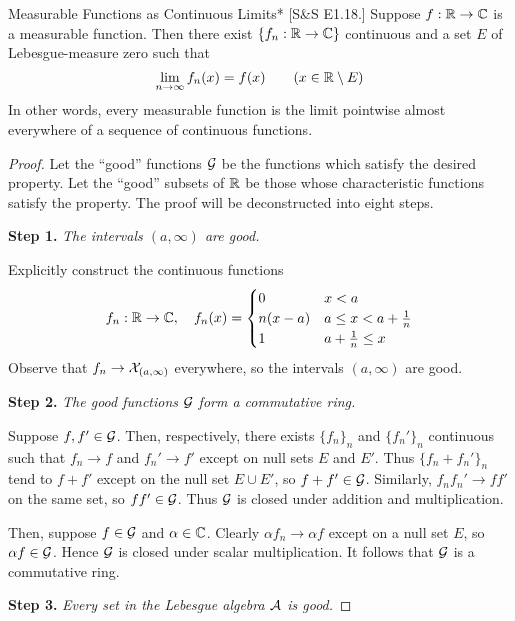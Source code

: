 \begin{problem}{Measurable Functions as Continuous Limits}*
    [S\&S E1.18.] Suppose \(f : \mathbb{R} \to \mathbb{C}\) is a measurable function. Then there exist \(\{f_n : \mathbb{R} \to \mathbb{C}\}\) continuous and a set \(E\) of Lebesgue-measure zero such that 
    \[
    \lim_{n \to \infty} f_n(x) = f(x) \qquad (x \in \mathbb{R} \setminus E)
    \]
    In other words, every measurable function is the limit pointwise almost everywhere of a sequence of continuous functions. 
\end{problem}

\begin{proof}
    Let the ``good'' functions \(\mathcal{G}\) be the functions which satisfy the desired property. Let the ``good'' subsets of \(\mathbb{R}\) be those whose characteristic functions satisfy the property. The proof will be deconstructed into eight steps. 

    \textbf{Step 1.} \emph{The intervals \((a, \infty)\) are good.}

    Explicitly construct the continuous functions
    \[
    f_n : \mathbb{R} \to \mathbb{C}, \quad 
    f_n(x) = \begin{cases}
    0 & x < a \\
    n(x - a) & a \leq x < a + \frac{1}{n} \\
    1 & a + \frac{1}{n} \leq x
    \end{cases}
    \]
    Observe that \(f_n \to \mathcal{X}_{(a, \infty)}\) everywhere, so the intervals \((a, \infty)\) are good. 

    \textbf{Step 2.} \emph{The good functions \(\mathcal{G}\) form a commutative ring.}

    Suppose \(f, f' \in \mathcal{G}\). Then, respectively, there exists \(\{f_n\}_n\) and \(\{f_n'\}_n\) continuous such that \(f_n \to f\) and \(f_n' \to f'\) except on null sets \(E\) and \(E'\). Thus \(\{f_n + f_n'\}_n\) tend to \(f+f'\) except on the null set \(E \cup E'\), so \(f + f' \in \mathcal{G}\). Similarly, \(f_n f_n' \to ff'\) on the same set, so \(f f' \in \mathcal{G}\). Thus \(\mathcal{G}\) is closed under addition and multiplication.

    Then, suppose \(f \in \mathcal{G}\) and \(\alpha \in \mathbb{C}\). Clearly \(\alpha f_n \to \alpha f\) except on a null set \(E\), so \(\alpha f \in \mathcal{G}\). Hence \(\mathcal{G}\) is closed under scalar multiplication. It follows that \(\mathcal{G}\) is a commutative ring. 

    \textbf{Step 3.} \emph{Every set in the Lebesgue algebra \(\mathcal{A}\) is good.}


\end{proof}
